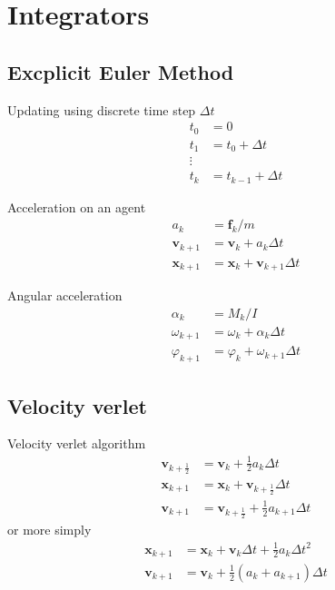 \section{Integrators}
\subsection{Excplicit Euler Method}
Updating using discrete time step $ \Delta t $
\begin{align}
t_{0} &= 0 \\
t_{1} &= t_{0} + \Delta t \\
\vdots \\
t_{k} &= t_{k-1} + \Delta t
\end{align}


Acceleration on an agent
\begin{align}
a_{k} &= \mathbf{f}_{k} / m \\
\mathbf{v}_{k+1} &= \mathbf{v}_{k} + a_{k} \Delta t \\
\mathbf{x}_{k+1} &= \mathbf{x}_{k} + \mathbf{v}_{k+1} \Delta t
\end{align}


Angular acceleration
\begin{align}
\alpha_{k} &= M_{k} / I \\
\omega_{k+1} &= \omega_{k} + \alpha_{k} \Delta t \\
\varphi_{k+1} &= \varphi_{k} + \omega_{k+1} \Delta t
\end{align}



\subsection{Velocity verlet}
Velocity verlet algorithm
\begin{align}
\mathbf{v}_{k+\frac{1}{2}} &= \mathbf{v}_{k} + \frac{1}{2} a_{k} \Delta t \\
\mathbf{x}_{k+1} &= \mathbf{x}_{k} + \mathbf{v}_{k+\frac{1}{2}} \Delta t \\
\mathbf{v}_{k+1} &= \mathbf{v}_{k+\frac{1}{2}} + \frac{1}{2} a_{k+1} \Delta t
\end{align}
or more simply
\begin{align}
\mathbf{x}_{k+1} &= \mathbf{x}_{k} + \mathbf{v}_{k} \Delta t + \frac{1}{2} a_{k} \Delta t^{2} \\
\mathbf{v}_{k+1} &= \mathbf{v}_{k} + \frac{1}{2} \left(a_{k} + a_{k+1}\right) \Delta t \\
\end{align}
